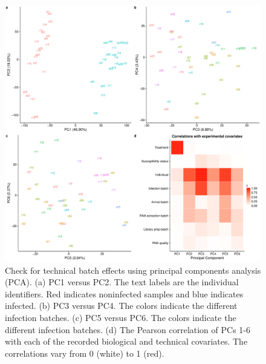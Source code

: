 \documentclass[fleqn,10pt]{wlscirep}
\begin{document}
\begin{figure}[ht]
\centering
\includegraphics[width=\linewidth]{../figure/batch-pca.pdf}
\caption{
Check for technical batch effects using principal components analysis
(PCA). (a) PC1 versus PC2. The text labels are the individual
identifiers. Red indicates noninfected samples and blue indicates
infected. (b) PC3 versus PC4. The colors indicate the different
infection batches. (c) PC5 versus PC6. The colors indicate the
different infection batches. (d) The Pearson correlation of PCs 1-6
with each of the recorded biological and technical covariates. The
correlations vary from 0 (white) to 1 (red).
}
\label{fig:batch}
\end{figure}
\end{document}
